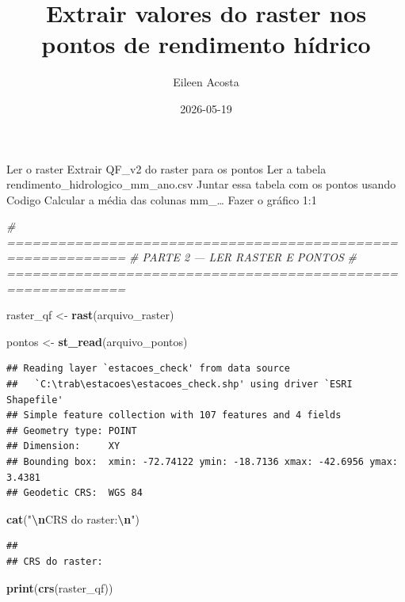 \documentclass[
]{article}
\title{Extrair valores do raster nos pontos de rendimento hídrico}
\author{Eileen Acosta}
\date{2026-05-19}
\newenvironment{Shaded}{\begin{snugshade}}{\end{snugshade}}
\newcommand{\CommentTok}[1]{\textcolor[rgb]{0.56,0.35,0.01}{\textit{#1}}}
\newcommand{\FunctionTok}[1]{\textcolor[rgb]{0.13,0.29,0.53}{\textbf{#1}}}
\newcommand{\NormalTok}[1]{#1}
\newcommand{\OtherTok}[1]{\textcolor[rgb]{0.56,0.35,0.01}{#1}}
\newcommand{\SpecialCharTok}[1]{\textcolor[rgb]{0.81,0.36,0.00}{\textbf{#1}}}
\newcommand{\StringTok}[1]{\textcolor[rgb]{0.31,0.60,0.02}{#1}}
\begin{document}
\maketitle

Ler o raster Extrair QF\_v2 do raster para os pontos Ler a tabela
rendimento\_hidrologico\_mm\_ano.csv Juntar essa tabela com os pontos
usando Codigo Calcular a média das colunas mm\_\ldots{} Fazer o gráfico
1:1

\begin{Shaded}
\begin{Highlighting}[]
\CommentTok{\# ============================================================}
\CommentTok{\# PARTE 2 — LER RASTER E PONTOS}
\CommentTok{\# ============================================================}

\NormalTok{raster\_qf }\OtherTok{\textless{}{-}} \FunctionTok{rast}\NormalTok{(arquivo\_raster)}

\NormalTok{pontos }\OtherTok{\textless{}{-}} \FunctionTok{st\_read}\NormalTok{(arquivo\_pontos)}
\end{Highlighting}
\end{Shaded}

\begin{verbatim}
## Reading layer `estacoes_check' from data source 
##   `C:\trab\estacoes\estacoes_check.shp' using driver `ESRI Shapefile'
## Simple feature collection with 107 features and 4 fields
## Geometry type: POINT
## Dimension:     XY
## Bounding box:  xmin: -72.74122 ymin: -18.7136 xmax: -42.6956 ymax: 3.4381
## Geodetic CRS:  WGS 84
\end{verbatim}

\begin{Shaded}
\begin{Highlighting}[]
\FunctionTok{cat}\NormalTok{(}\StringTok{"}\SpecialCharTok{\textbackslash{}n}\StringTok{CRS do raster:}\SpecialCharTok{\textbackslash{}n}\StringTok{"}\NormalTok{)}
\end{Highlighting}
\end{Shaded}

\begin{verbatim}
## 
## CRS do raster:
\end{verbatim}

\begin{Shaded}
\begin{Highlighting}[]
\FunctionTok{print}\NormalTok{(}\FunctionTok{crs}\NormalTok{(raster\_qf))}
\end{Highlighting}
\end{Shaded}
\end{document}

